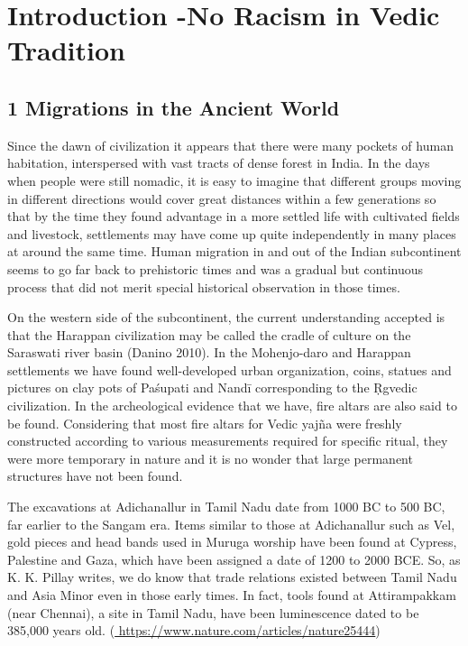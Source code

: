 
\chapter{Introduction -\break No Racism in Vedic Tradition}\label{intro}



\section*{1 Migrations in the Ancient World}

Since the dawn of civilization it appears that there were many pockets of human habitation, interspersed with vast tracts of dense forest in India. In the days when people were still nomadic, it is easy to imagine that different groups moving in different directions would cover great distances within a few generations so that by the time they found advantage in a more settled life with cultivated fields and livestock, settlements may have come up quite independently in many places at around the same time. Human migration in and out of the Indian subcontinent seems to go far back to prehistoric times and was a gradual but continuous process that did not merit special historical observation in those times.

On the western side of the subcontinent, the current understanding accepted is that the Harappan civilization may be called the cradle of culture on the Saraswati river basin (Danino 2010). In the Mohenjo-daro and Harappan settlements we have found well-developed urban organization, coins, statues and pictures on clay pots of Paśupati and Nandī corresponding to the Ṛgvedic civilization. In the archeological evidence that we have, fire altars are also said to be found. Considering that most fire altars for Vedic yajña were freshly constructed according to various measurements required for specific ritual, they were more temporary in nature and it is no wonder that large permanent structures have not been found.

\newpage

The excavations at Adichanallur in Tamil Nadu date from 1000 BC to 500 BC, far earlier to the Sangam era. Items similar to those at Adichanallur such as Vel, gold pieces and head bands used in Muruga worship have been found at Cypress, Palestine and Gaza, which have been assigned a date of 1200 to 2000 BCE. So, as K. K. Pillay writes, we do know that trade relations existed between Tamil Nadu and Asia Minor even in those early times. In fact, tools found at Attirampakkam (near Chennai), a site in Tamil Nadu, have been luminescence dated to be 385,000 years old. (\url{ https://www.nature.com/articles/nature25444})

